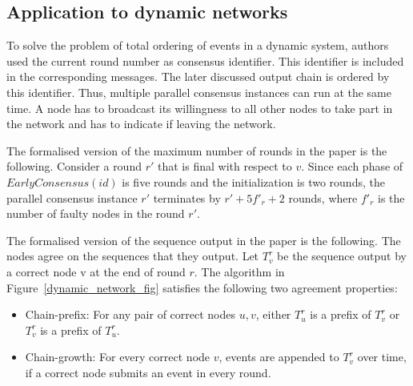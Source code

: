 \documentclass{article}
\begin{document}
\subsection{Application to dynamic networks}
To solve the problem of total ordering of events in a dynamic system, authors used the current round number as consensus identifier. This identifier is included in the corresponding messages. The later discussed output chain is ordered by this identifier. Thus, multiple parallel consensus instances can run at the same time. A node has to broadcast its willingness to all other nodes to take part in the network and has to indicate if leaving the network.

The formalised version of the maximum number of rounds in the paper is the following. Consider a round \(r'\) that is final with respect to \(v\). Since each phase of \(EarlyConsensus(id)\) is five rounds and the initialization is two rounds, the parallel consensus instance \(r'\) terminates by \(r' +5f'_r +2\) rounds, where \(f'_r\) is the number of faulty nodes in the round \(r'\).

The formalised version of the sequence output in the paper is the following. The nodes agree on the sequences that they output. Let \(T^r_v\) be the sequence output by a correct node v at the end of round \(r\). The algorithm in Figure~\ref{dynamic_network_fig} satisfies the following two agreement properties:
\begin{itemize}
  \item Chain-prefix: For any pair of correct nodes \(u, v\), either \(T^r_u\) is a prefix of \(T^r_v\) or \(T^r_v\) is a prefix of \(T^r_u\).
  \item Chain-growth: For every correct node \(v\), events are appended to \(T^r_v\) over time, if a correct node submits an event in every round.
\end{itemize}
\end{document}

